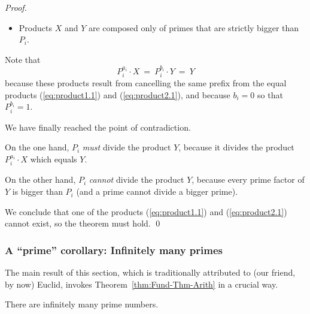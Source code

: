 \begin{proof}
\begin{itemize}
\item
Products $X$ and $Y$ are composed only of primes that are strictly bigger than $P_i$.
\end{itemize}
Note that 
\[ P_i^{a_i} \cdot X \ = \ P_i^{b_i} \cdot Y \ = \ Y \]
because these products result from cancelling the same prefix from the equal products (\ref{eq:product1.1}) and (\ref{eq:product2.1}), and because $b_i =0$ so that $P_i^{b_i} = 1$.

\medskip

\noindent
We have finally reached the point of contradiction.

\smallskip

On the one hand, $P_i$ {\em must} divide the product $Y$, because it divides the product $P_i^{a_i} \cdot X$ which equals $Y$.

On the other hand, $P_i$ {\em cannot} divide the product $Y$, because every prime factor of $Y$ is bigger than $P_i$ (and a prime cannot divide a bigger prime).

\smallskip

We conclude that one of the products (\ref{eq:product1.1}) and (\ref{eq:product2.1}) cannot exist, so the theorem must hold.  \qed
\end{proof}


\subsubsection{A ``prime'' corollary: Infinitely many primes}
\label{sec:infinite-primes}

The main result of this section, which is traditionally attributed to (our friend, by now) Euclid, invokes
Theorem~\ref{thm:Fund-Thm-Arith} in a crucial way.

\begin{prop}
\label{thm:infinite-primes}
There are infinitely many prime numbers.
\end{prop}

